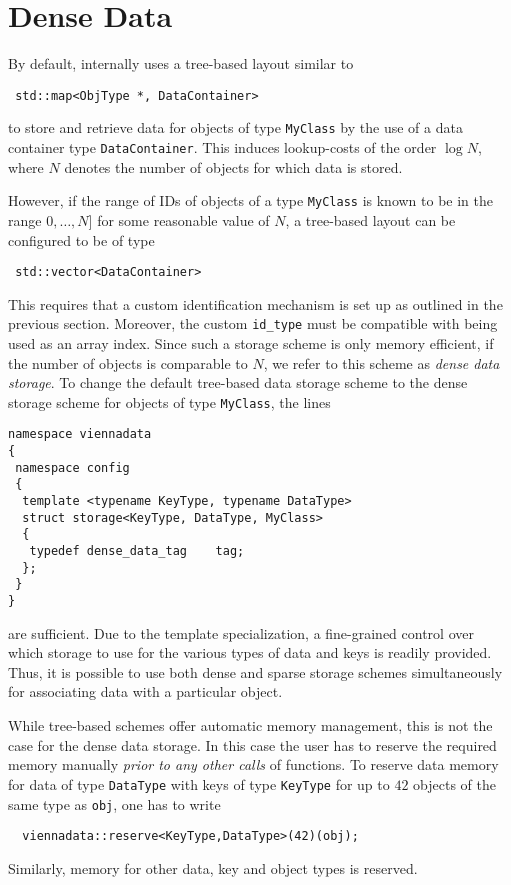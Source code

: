 \section{Dense Data} \label{sec:dense-data}
By default, {\ViennaData} internally uses a tree-based layout similar to
\begin{lstlisting}
 std::map<ObjType *, DataContainer>
\end{lstlisting}
to store and retrieve data for objects of type \lstinline|MyClass| by the use of a data container type \lstinline|DataContainer|.
This induces lookup-costs of the order $\log N$, where $N$ denotes the number of objects for which data is stored.

However, if the range of IDs of objects of a type \lstinline|MyClass| is known to be in the range $0, \ldots, N]$ for some reasonable value of $N$,
a tree-based layout can be configured to be of type
\begin{lstlisting}
 std::vector<DataContainer>
\end{lstlisting}
This requires that a custom identification mechanism is set up as outlined in the previous section. Moreover, the 
custom \lstinline|id_type| must be compatible with being used as an array index. Since such a storage scheme is only memory efficient,
if the number of objects is comparable to $N$, we refer to this scheme as \emph{dense data storage}.
To change the default tree-based data storage scheme to the dense storage scheme for objects of type \lstinline|MyClass|, the lines
\begin{lstlisting}
namespace viennadata
{
 namespace config
 {
  template <typename KeyType, typename DataType>
  struct storage<KeyType, DataType, MyClass>
  {
   typedef dense_data_tag    tag;
  };
 }
}
\end{lstlisting}
are sufficient. Due to the template specialization, a fine-grained control over which storage to use for the various types of data and keys is readily provided. Thus, it is possible to use both dense and sparse storage schemes simultaneously for associating data with a particular object.

While tree-based schemes offer automatic memory management, this is not the case for the dense data storage. In this case 
the user has to reserve the required memory manually \emph{prior to any other calls} of {\ViennaData} functions.
To reserve data memory for data of type \lstinline|DataType| with keys of type \lstinline|KeyType| for up to $42$ objects of the same type as \lstinline|obj|,
one has to write
\begin{lstlisting}
  viennadata::reserve<KeyType,DataType>(42)(obj);
\end{lstlisting}
Similarly, memory for other data, key and object types is reserved.

